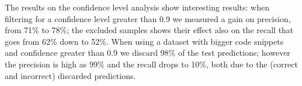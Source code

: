 The results on the confidence level analysis show interesting results: when filtering for a confidence level greater than 0.9 we measured a gain on precision, from 71\% to 78\%; the excluded samples shows their effect also on the recall that goes from 62\% down to 52\%. When using a dataset with bigger code snippets and confidence greater than 0.9 we discard 98\% of the test predictions; however the precision is high as 99\% and the recall drops to 10\%, both due to the (correct and incorrect) discarded predictions.







